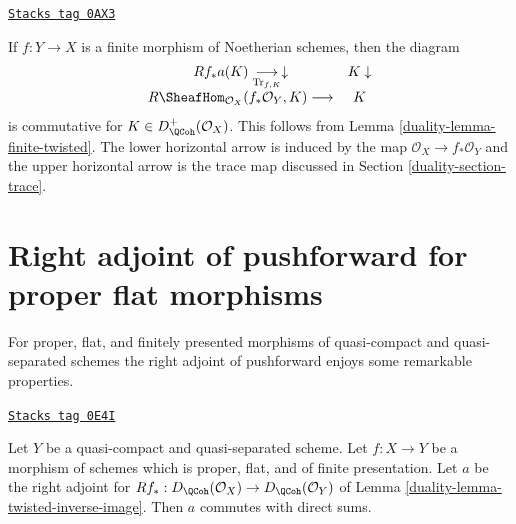 \begin{remark}
\label{duality-remark-trace-map-finite}
\href{https://stacks.math.columbia.edu/tag/0AX3}{\texttt{Stacks tag 0AX3}}

If $f : Y \to X$ is a finite morphism of Noetherian schemes, then the diagram
$$
\begin{array}{cc}Rf_*a(K) \underset{\text{Tr}_{f, K}}{\longrightarrow}\downarrow & K \downarrow \\ R\SheafHom_{\mathcal{O}_X}(f_*\mathcal{O}_Y, K) \longrightarrow & K\end{array}
$$
is commutative for $K \in D_\QCoh^+(\mathcal{O}_X)$. This follows
from Lemma \ref{duality-lemma-finite-twisted}. The lower horizontal
arrow is induced by the map $\mathcal{O}_X \to f_*\mathcal{O}_Y$ and the
upper horizontal arrow is the trace map discussed in
Section \ref{duality-section-trace}.
\end{remark}

\section{Right adjoint of pushforward for proper flat morphisms}
\label{duality-section-proper-flat}
For proper, flat, and finitely presented morphisms of quasi-compact
and quasi-separated schemes the right adjoint of pushforward
enjoys some remarkable properties.

\begin{lemma}
\label{duality-lemma-proper-flat}
\href{https://stacks.math.columbia.edu/tag/0E4I}{\texttt{Stacks tag 0E4I}}

Let $Y$ be a quasi-compact and quasi-separated scheme.
Let $f : X \to Y$ be a morphism of schemes which is proper, flat, and
of finite presentation.
Let $a$ be the right adjoint for
$Rf_* : D_\QCoh(\mathcal{O}_X) \to D_\QCoh(\mathcal{O}_Y)$ of
Lemma \ref{duality-lemma-twisted-inverse-image}. Then $a$ commutes with direct sums.
\end{lemma}


